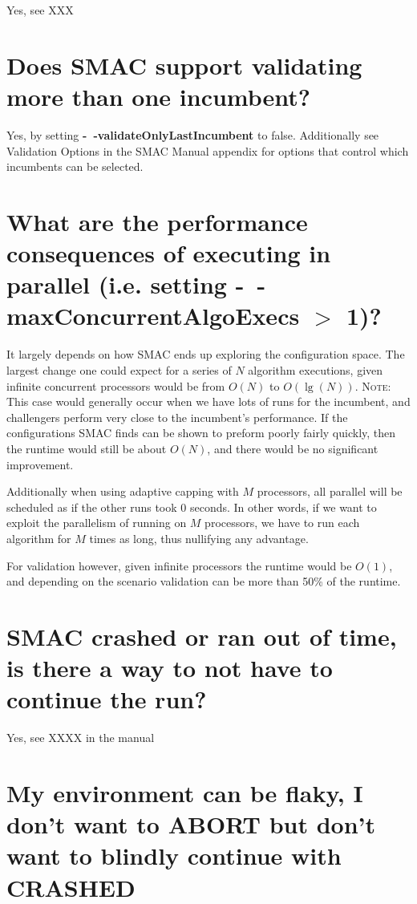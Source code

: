\documentclass[11pt,letterpaper,oneside]{article}
\begin{document}
	Yes, see XXX

\section{Does SMAC support validating more than one incumbent?}

	Yes, by setting \textbf{-~$\!$-validateOnlyLastIncumbent} to false. Additionally see {Validation Options} in the SMAC Manual appendix for options that control which incumbents can be selected.

\section{What are the performance consequences of executing in parallel (i.e. setting \textbf{-~$\!$-maxConcurrentAlgoExecs} $>$ 1)?}
	
	It largely depends on how SMAC ends up exploring the configuration space. The largest change one could expect for a series of $N$ algorithm executions, given infinite concurrent processors would be from $O(N)$ to $O(\lg(N))$. \textsc{Note:} This case would generally occur when we have lots of runs for the incumbent, and challengers perform very close to the incumbent's performance. If the configurations SMAC finds can be shown to preform poorly fairly quickly, then the runtime would still be about $O(N)$, and there would be no significant improvement.
	
	Additionally when using adaptive capping with $M$ processors, all parallel will be scheduled as if the other runs took 0 seconds. In other words, if we want to exploit the parallelism of running on $M$ processors, we have to run each algorithm for $M$ times as long, thus nullifying any advantage.
	
	For validation however, given infinite processors the runtime would be $O(1)$, and depending on the scenario validation can be more than 50\% of the runtime.

\section{SMAC crashed or ran out of time, is there a way to not have to continue the run?}

	Yes, see XXXX in the manual

\section{My environment can be flaky, I don't want to ABORT but don't want to blindly continue with CRASHED}
\end{document}

